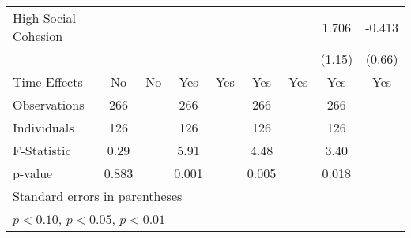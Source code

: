 \begin{table}[htbp]
\begin{tabular}{l*{8}{c}}
\hspace{0.25cm} High Social Cohesion&             &             &             &             &             &             &1.706        &-0.413        \\
                              &             &             &             &             &             &             &(1.15)        &(0.66)        \\
Time Effects                  &   No        &   No        &  Yes        &  Yes        &  Yes        &  Yes        &  Yes        &  Yes        \\
\midrule
Observations                  &  266        &             &  266        &             &  266        &             &  266        &             \\
Individuals                   &  126        &             &  126        &             &  126        &             &  126        &             \\
F-Statistic                   & 0.29        &             & 5.91        &             & 4.48        &             & 3.40        &             \\
p-value                       &0.883        &             &0.001        &             &0.005        &             &0.018        &             \\
\bottomrule
\multicolumn{9}{l}{\footnotesize Standard errors in parentheses}\\
\multicolumn{9}{l}{\footnotesize \sym{^+} \(p<0.10\), \sym{*} \(p<0.05\), \sym{**} \(p<0.01\)}\\
\end{tabular}
\end{table}
